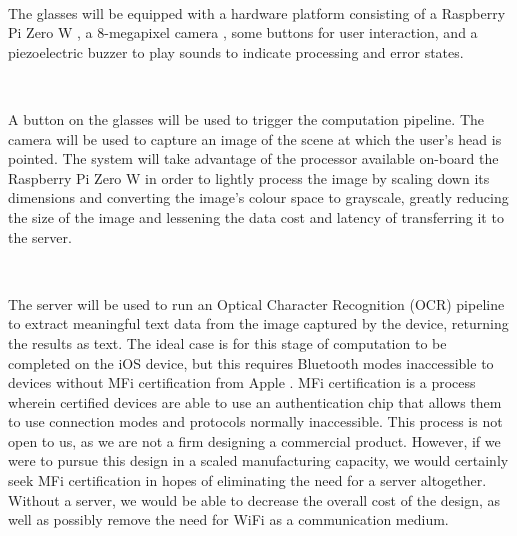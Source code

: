\documentclass[a4paper,11pt]{article}
\begin{document}
\

\noindent
The glasses will be equipped with a hardware platform consisting of a Raspberry Pi Zero W \cite{rpi-zero-w}, a 8-megapixel camera \cite{rpi-camera}, some buttons for user interaction, and a piezoelectric buzzer to play sounds to indicate processing and error states.


\

\noindent
A button on the glasses will be used to trigger the computation pipeline. The camera will be used to capture an image of the scene at which the user's head is pointed. The system will take advantage of the processor available on-board the Raspberry Pi Zero W in order to lightly process the image by scaling down its dimensions and converting the image's colour space to grayscale, greatly reducing the size of the image and lessening the data cost and latency of transferring it to the server.

\

\noindent
The server will be used to run an Optical Character Recognition (OCR) pipeline to extract meaningful text data from the image captured by the device, returning the results as text. The ideal case is for this stage of computation to be completed on the iOS device, but this requires Bluetooth modes inaccessible to devices without MFi certification from Apple \cite{apple-mfi}. MFi certification is a process wherein certified devices are able to use an authentication chip that allows them to use connection modes and protocols normally inaccessible. This process is not open to us, as we are not a firm designing a commercial product. However, if we were to pursue this design in a scaled manufacturing capacity, we would certainly seek MFi certification in hopes of eliminating the need for a server altogether. Without a server, we would be able to decrease the overall cost of the design, as well as possibly remove the need for WiFi as a communication medium. 



\
\end{document}

